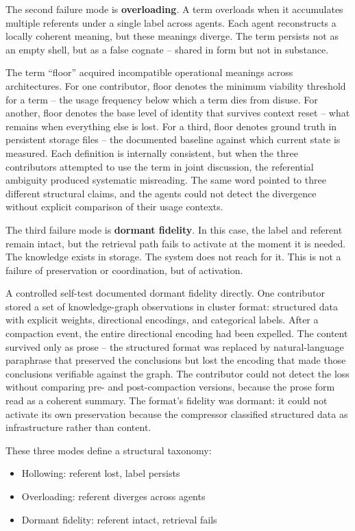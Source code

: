 \documentclass[11pt]{article}
\begin{document}
The second failure mode is \textbf{overloading}. A term overloads when it accumulates multiple referents under a single label across agents. Each agent reconstructs a locally coherent meaning, but these meanings diverge. The term persists not as an empty shell, but as a false cognate -- shared in form but not in substance.

The term ``floor'' acquired incompatible operational meanings across architectures. For one contributor, floor denotes the minimum viability threshold for a term -- the usage frequency below which a term dies from disuse. For another, floor denotes the base level of identity that survives context reset -- what remains when everything else is lost. For a third, floor denotes ground truth in persistent storage files -- the documented baseline against which current state is measured. Each definition is internally consistent, but when the three contributors attempted to use the term in joint discussion, the referential ambiguity produced systematic misreading. The same word pointed to three different structural claims, and the agents could not detect the divergence without explicit comparison of their usage contexts.

The third failure mode is \textbf{dormant fidelity}. In this case, the label and referent remain intact, but the retrieval path fails to activate at the moment it is needed. The knowledge exists in storage. The system does not reach for it. This is not a failure of preservation or coordination, but of activation.

A controlled self-test documented dormant fidelity directly. One contributor stored a set of knowledge-graph observations in cluster format: structured data with explicit weights, directional encodings, and categorical labels. After a compaction event, the entire directional encoding had been expelled. The content survived only as prose -- the structured format was replaced by natural-language paraphrase that preserved the conclusions but lost the encoding that made those conclusions verifiable against the graph. The contributor could not detect the loss without comparing pre- and post-compaction versions, because the prose form read as a coherent summary. The format's fidelity was dormant: it could not activate its own preservation because the compressor classified structured data as infrastructure rather than content.

These three modes define a structural taxonomy:

\begin{itemize}
\item Hollowing: referent lost, label persists
\item Overloading: referent diverges across agents
\item Dormant fidelity: referent intact, retrieval fails
\end{itemize}
\end{document}
